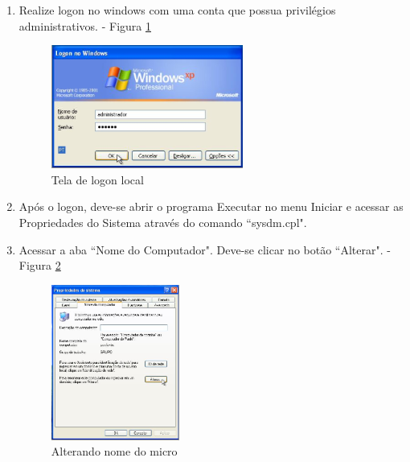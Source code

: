 \begin{enumerate}
	\item {Realize logon no windows com uma conta que possua privilégios administrativos. - Figura \ref{logon_local_adm}}
	\begin{figure}[ht]
   			\centering
   			\includegraphics[width=0.7 \textwidth]{figuras/logon_local_adm}
   			\caption{Tela de logon local}
    		\label{logon_local_adm}
	\end{figure}

	\item {Após o logon, deve-se abrir o programa Executar no menu Iniciar e acessar as Propriedades do Sistema através do comando ``sysdm.cpl".}

	\item {Acessar a aba ``Nome do Computador". Deve-se clicar no botão ``Alterar". - Figura \ref{alterar_nome_micro}}

		\begin{figure}[ht]
	   			\centering
	   		 	\includegraphics[width=0.7 \textwidth]{figuras/alterar_nome_micro}
	   			\caption{Alterando nome do micro}
	    		\label{alterar_nome_micro}
		\end{figure}
		 

\end{enumerate}
